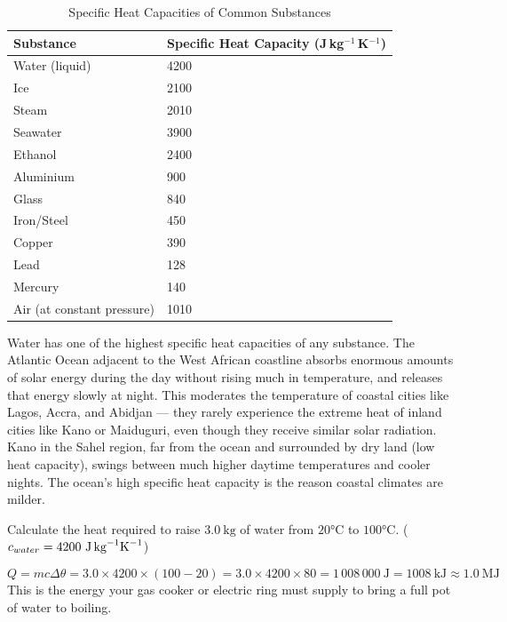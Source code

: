 \begin{table}[H]
\centering
\caption{Specific Heat Capacities of Common Substances}
\label{tab:shc}
\begin{tabular}{ll}
\toprule
\textbf{Substance} &
\textbf{Specific Heat Capacity (J\,kg$^{-1}$\,K$^{-1}$)}\\
\midrule
Water (liquid) & 4200\\
Ice & 2100\\
Steam & 2010\\
Seawater & 3900\\
Ethanol & 2400\\
Aluminium & 900\\
Glass & 840\\
Iron/Steel & 450\\
Copper & 390\\
Lead & 128\\
Mercury & 140\\
Air (at constant pressure) & 1010\\
\bottomrule
\end{tabular}
\end{table}

\begin{realworldbox}
Water has one of the highest specific heat capacities
of any substance. The Atlantic Ocean adjacent to the
West African coastline absorbs enormous amounts of
solar energy during the day without rising much in
temperature, and releases that energy slowly at night.
This moderates the temperature of coastal cities
like Lagos, Accra, and Abidjan --- they rarely experience
the extreme heat of inland cities like Kano or Maiduguri,
even though they receive similar solar radiation.
Kano in the Sahel region, far from the ocean and
surrounded by dry land (low heat capacity), swings
between much higher daytime temperatures and cooler
nights. The ocean's high specific heat capacity is
the reason coastal climates are milder.
\end{realworldbox}

\begin{examplebox}[15.1]
Calculate the heat required to raise $3.0\ \text{kg}$
of water from $20°\text{C}$ to $100°\text{C}$.
($c_{water} = 4200\ \text{J\,kg}^{-1}\text{K}^{-1}$)
\end{examplebox}

\begin{solutionbox}
\[
  Q = mc\Delta\theta
  = 3.0 \times 4200 \times (100 - 20)
  = 3.0 \times 4200 \times 80
  = 1\,008\,000\ \text{J}
  = 1008\ \text{kJ} \approx 1.0\ \text{MJ}
\]
This is the energy your gas cooker or electric ring
must supply to bring a full pot of water to boiling.
\end{solutionbox}

